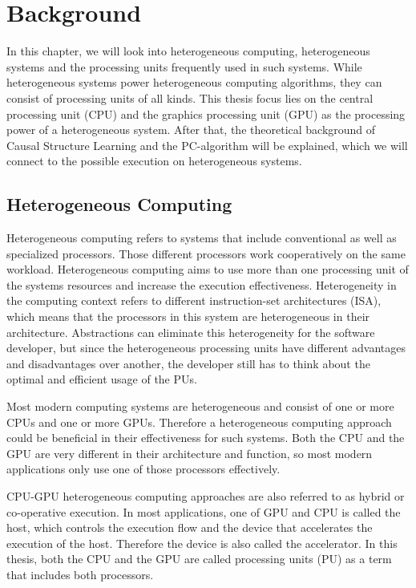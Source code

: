 \chapter{Background}
In this chapter, we will look into heterogeneous computing, heterogeneous systems and the processing units frequently used in such systems. While heterogeneous systems power heterogeneous computing algorithms, they can consist of processing units of all kinds. This thesis focus lies on the central processing unit (CPU) and the graphics processing unit (GPU) as the processing power of a heterogeneous system.
After that, the theoretical background of Causal Structure Learning and the PC-algorithm will be explained, which we will connect to the possible execution on heterogeneous systems.

\section{Heterogeneous Computing}
Heterogeneous computing refers to systems that include conventional as well as specialized processors. Those different processors work cooperatively on the same workload. \cite{shanHeterogeneousProcessingStrategy2006} Heterogeneous computing aims to use more than one processing unit of the systems resources and increase the execution effectiveness. Heterogeneity in the computing context refers to different instruction-set architectures (ISA), which means that the processors in this system are heterogeneous in their architecture.
Abstractions can eliminate this heterogeneity for the software developer, but since the heterogeneous processing units have different advantages and disadvantages over another, the developer still has to think about the optimal and efficient usage of the PUs.

Most modern computing systems are heterogeneous and consist of one or more CPUs and one or more GPUs. Therefore a heterogeneous computing approach could be beneficial in their effectiveness for such systems. Both the CPU and the GPU are very different in their architecture and function, so most modern applications only use one of those processors effectively.

CPU-GPU heterogeneous computing approaches are also referred to as hybrid or co-operative execution. In most applications, one of GPU and CPU is called the host, which controls the execution flow and the device that accelerates the execution of the host. Therefore the device is also called the accelerator. In this thesis, both the CPU and the GPU are called processing units (PU) as a term that includes both processors.

